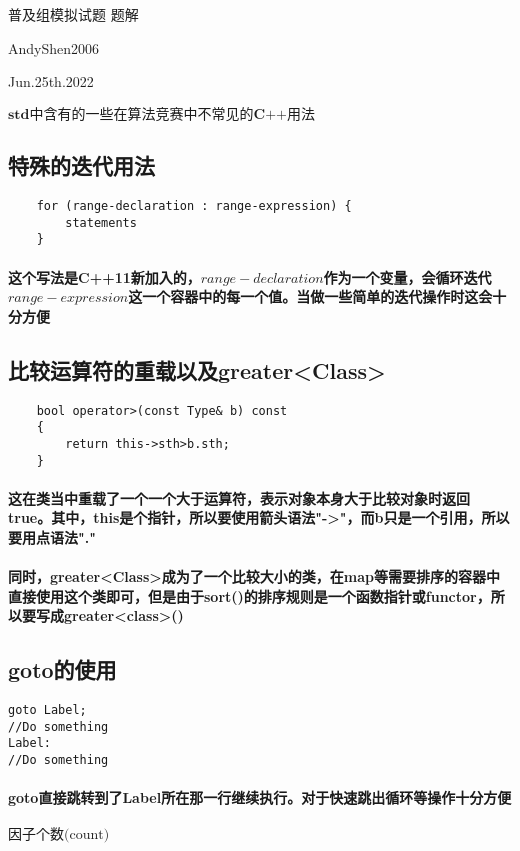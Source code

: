 \documentclass[final,11pt,oneside,UTF8]{report}
\begin{document}
\centerline{\LARGE{普及组模拟试题 题解}}
\centerline{}
\centerline{\LARGE{AndyShen2006}}
\centerline{}
\centerline{\LARGE{Jun.25th.2022}}
\centerline{}
\newpage
\centerline{\LARGE{$\textbf{std中含有的一些在算法竞赛中不常见的C++用法}$}}
\subsection{特殊的迭代用法}
{\mono\begin{lstlisting}
    for (range-declaration : range-expression) {
        statements
    }
\end{lstlisting}}
\paragraph{这个写法是C++11新加入的，$range-declaration$作为一个变量，会循环迭代$range-expression$这一个容器中的每一个值。当做一些简单的迭代操作时这会十分方便}
\subsection{比较运算符的重载以及greater<Class>}
{
    \mono\begin{lstlisting}
    bool operator>(const Type& b) const
    {
        return this->sth>b.sth;
    }
\end{lstlisting}
}
\paragraph{这在类当中重载了一个一个大于运算符，表示对象本身大于比较对象时返回true。其中，this是个指针，所以要使用箭头语法"->"，而b只是一个引用，所以要用点语法"."}
\paragraph{同时，greater<Class>成为了一个比较大小的类，在map等需要排序的容器中直接使用这个类即可，但是由于sort()的排序规则是一个函数指针或functor，所以要写成greater<class>()}
\subsection{goto的使用}
{
    \mono\begin{lstlisting}
goto Label;
//Do something
Label:
//Do something
    \end{lstlisting}
}
\paragraph{goto直接跳转到了Label所在那一行继续执行。对于快速跳出循环等操作十分方便}
\newpage
\centerline{\LARGE{$\textbf{因子个数}\text{(count)}$}}
\end{document}
